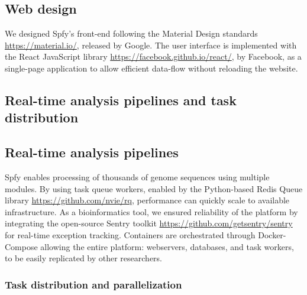\documentclass[a4,center,fleqn]{NAR}
\begin{document}
\subsection{Web design}

We designed Spfy's front-end following the Material Design standards \url{https://material.io/}, released by Google.
The user interface is implemented with the React JavaScript library \url{https://facebook.github.io/react/}, by Facebook, as a single-page application to allow efficient data-flow without reloading the website.

\subsection{Real-time analysis pipelines and task distribution}
\subsection{Real-time analysis pipelines}

Spfy enables processing of thousands of genome sequences using multiple modules.
By using task queue workers, enabled by the Python-based Redis Queue library \url{https://github.com/nvie/rq}, performance can quickly scale to available infrastructure.
As a bioinformatics tool, we ensured reliability of the platform by integrating the open-source Sentry toolkit \url{https://github.com/getsentry/sentry} for real-time exception tracking.
Containers are orchestrated through Docker-Compose allowing the entire platform: webservers, databases, and task workers, to be easily replicated by other researchers.

\subsubsection{Task distribution and parallelization}
\end{document}
